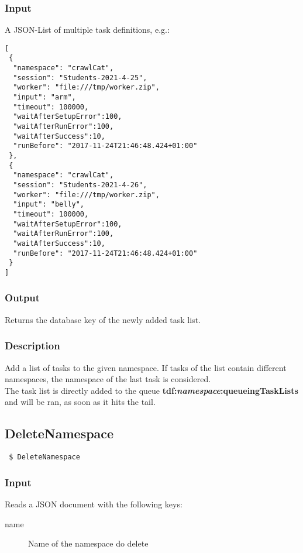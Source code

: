 \documentclass[a4paper,11pt]{article}
\begin{document}
\subsubsection{Input}
A JSON-List of multiple task definitions, e.g.:
\begin{verbatim}
[
 {
  "namespace": "crawlCat",
  "session": "Students-2021-4-25",
  "worker": "file:///tmp/worker.zip",
  "input": "arm",
  "timeout": 100000,
  "waitAfterSetupError":100,
  "waitAfterRunError":100,
  "waitAfterSuccess":10,
  "runBefore": "2017-11-24T21:46:48.424+01:00"
 },
 {
  "namespace": "crawlCat",
  "session": "Students-2021-4-26",
  "worker": "file:///tmp/worker.zip",
  "input": "belly",
  "timeout": 100000,
  "waitAfterSetupError":100,
  "waitAfterRunError":100,
  "waitAfterSuccess":10,
  "runBefore": "2017-11-24T21:46:48.424+01:00"
 }
]
\end{verbatim}

\subsubsection{Output}
Returns the database key of the newly added task list.

\subsubsection{Description}
Add a list of tasks to the given namespace. If tasks of the list contain different namespaces, the namespace of the last task is considered.\\
The task list is directly added to the queue \textbf{tdf:\textit{namespace}:queueingTaskLists} and will be ran, as soon as it hits the tail.

\newpage


\subsection{DeleteNamespace\label{cmd:DeleteNamespace}}
\begin{verbatim}
 $ DeleteNamespace
\end{verbatim}

\subsubsection{Input}
Reads a JSON document with the following keys:
\begin{description}
\item[name] Name of the namespace do delete
\end{description}
\end{document}
